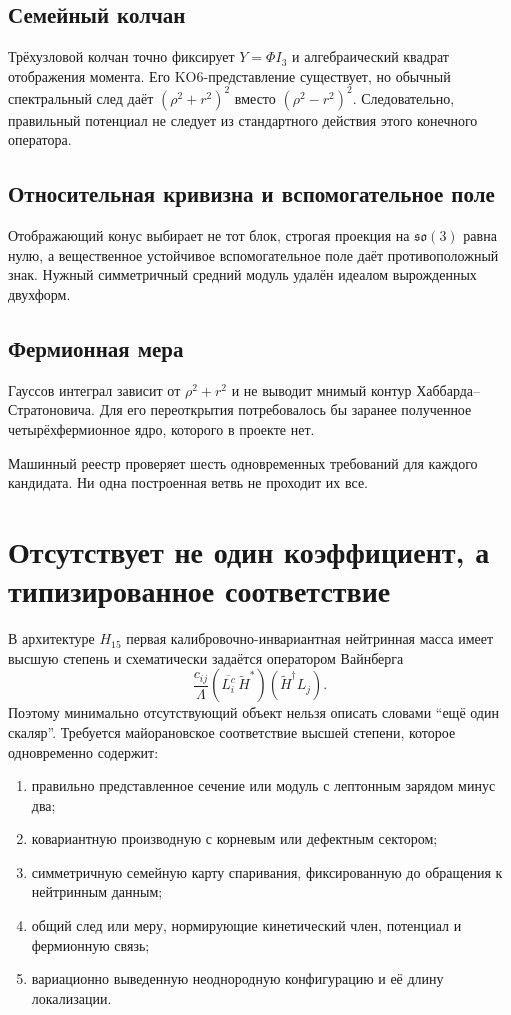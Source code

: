 \subsection{Семейный колчан}

Трёхузловой колчан точно фиксирует $Y=\Phi I_3$ и алгебраический квадрат
отображения момента. Его KO6-представление существует, но обычный
спектральный след даёт $(\rho^2+r^2)^2$ вместо
$(\rho^2-r^2)^2$. Следовательно, правильный потенциал не следует из
стандартного действия этого конечного оператора.

\subsection{Относительная кривизна и вспомогательное поле}

Отображающий конус выбирает не тот блок, строгая проекция на
$\mathfrak{so}(3)$ равна нулю, а вещественное устойчивое вспомогательное
поле даёт противоположный знак. Нужный симметричный средний модуль удалён
идеалом вырожденных двухформ.

\subsection{Фермионная мера}

Гауссов интеграл зависит от $\rho^2+r^2$ и не выводит мнимый контур
Хаббарда--Стратоновича. Для его переоткрытия потребовалось бы заранее
полученное четырёхфермионное ядро, которого в проекте нет.

Машинный реестр проверяет шесть одновременных требований для каждого
кандидата. Ни одна построенная ветвь не проходит их все.

\section{Отсутствует не один коэффициент, а типизированное соответствие}

В архитектуре $H_{15}$ первая калибровочно-инвариантная нейтринная масса
имеет высшую степень и схематически задаётся оператором Вайнберга
\begin{equation}
 \frac{c_{ij}}{\Lambda}
 (\overline{L_i^c}\,\widetilde H^*)
 (\widetilde H^\dagger L_j).
 \label{eq:v5-freeze-weinberg}
\end{equation}
Поэтому минимально отсутствующий объект нельзя описать словами
``ещё один скаляр''. Требуется майорановское соответствие высшей степени,
которое одновременно содержит:
\begin{enumerate}
 \item правильно представленное сечение или модуль с лептонным зарядом
 минус два;
 \item ковариантную производную с корневым или дефектным сектором;
 \item симметричную семейную карту спаривания, фиксированную до обращения к
 нейтринным данным;
 \item общий след или меру, нормирующие кинетический член, потенциал и
 фермионную связь;
 \item вариационно выведенную неоднородную конфигурацию и её длину
 локализации.
\end{enumerate}

